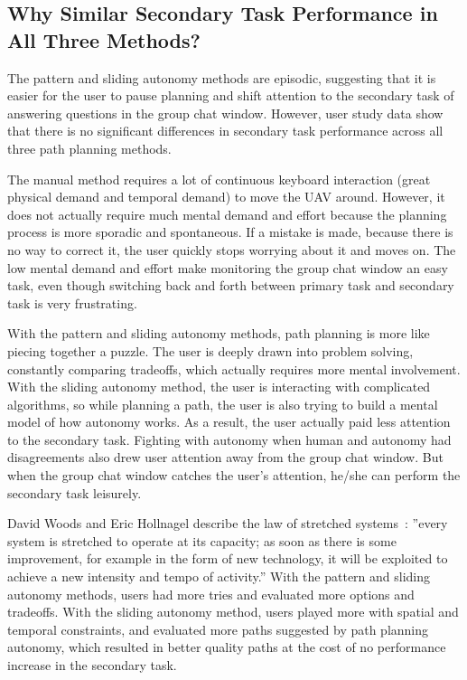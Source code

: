 \subsection{Why Similar Secondary Task Performance in All Three Methods?}

The pattern and sliding autonomy methods are episodic, suggesting that it is easier for the user to pause planning and shift attention to the secondary task of answering questions in the group chat window. However, user study data show that there is no significant differences in secondary task performance across all three path planning methods.

The manual method requires a lot of continuous keyboard interaction (great physical demand and temporal demand) to move the UAV around. However, it does not actually require much mental demand and effort because the planning process is more sporadic and spontaneous. If a mistake is made, because there is no way to correct it, the user quickly stops worrying about it and moves on. The low mental demand and effort make monitoring the group chat window an easy task, even though switching back and forth between primary task and secondary task is very frustrating.

With the pattern and sliding autonomy methods, path planning is more like piecing together a puzzle. The user is deeply drawn into problem solving, constantly comparing tradeoffs, which actually requires more mental involvement. With the sliding autonomy method, the user is interacting with complicated algorithms, so while planning a path, the user is also trying to build a mental model of how autonomy works. As a result, the user actually paid less attention to the secondary task. Fighting with autonomy when human and autonomy had disagreements also drew user attention away from the group chat window. But when the group chat window catches the user's attention, he/she can perform the secondary task leisurely.

David Woods and Eric Hollnagel describe the law of stretched systems~\cite{Woods2006Joint}: ''every system is stretched to operate at its capacity; as soon as there is some improvement, for example in the form of new technology, it will be exploited to achieve a new intensity and tempo of activity.'' With the pattern and sliding autonomy methods, users had more tries and evaluated more options and tradeoffs. With the sliding autonomy method, users played more with spatial and temporal constraints, and evaluated more paths suggested by path planning autonomy, which resulted in better quality paths at the cost of no performance increase in the secondary task.

